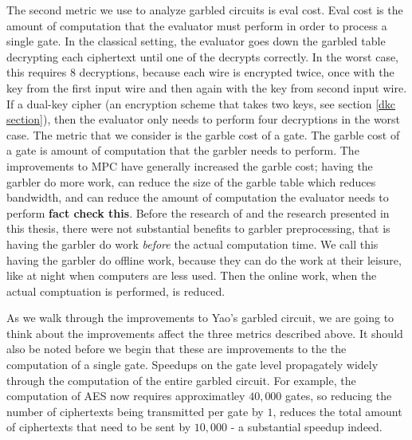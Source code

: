 The second metric we use to analyze garbled circuits is eval cost.
Eval cost is the amount of computation that the evaluator must perform in order to process a single gate.
In the classical setting, the evaluator goes down the garbled table decrypting each ciphertext until one of the decrypts correctly. 
In the worst case, this requires 8 decryptions, because each wire is encrypted twice, once with the key from the first input wire and then again with the key from second input wire.
If a dual-key cipher (an encryption scheme that takes two keys, see section \ref{dkc section}), then the evaluator only needs to perform four decryptions in the worst case.
The metric that we consider is the garble cost of a gate. 
The garble cost of a gate is amount of computation that the garbler needs to perform.
The improvements to MPC have generally increased the garble cost; having the garbler do more work, can reduce the size of the garble table which reduces bandwidth, and can reduce the amount of computation the evaluator needs to perform \textbf{fact check this}.
Before the research of \cite{our_paper} and the research presented in this thesis, there were not substantial benefits to garbler preprocessing, that is having the garbler do work \textit{before} the actual computation time. 
We call this having the garbler do offline work, because they can do the work at their leisure, like at night when computers are less used.
Then the online work, when the actual comptuation is performed, is reduced.

As we walk through the improvements to Yao's garbled circuit, we are going to think about the improvements affect the three metrics described above.
It should also be noted before we begin that these are improvements to the the computation of a single gate.
Speedups on the gate level propagately widely through the computation of the entire garbled circuit.
For example, the computation of AES now requires approximatley $40,000$ gates, so reducing the number of ciphertexts being transmitted per gate by $1$, reduces the total amount of ciphertexts that need to be sent by $10,000$ - a substantial speedup indeed.


